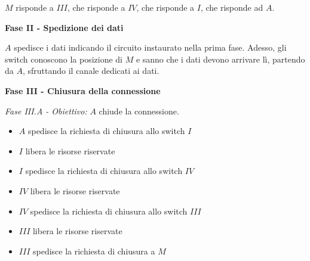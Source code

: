             $M$ risponde a $III$, che risponde a $IV$, che risponde a $I$, che risponde ad $A$.
            
            \vspace{3mm}
            
            \textbf{Fase II - Spedizione dei dati}
            
            \vspace{3mm}
            
            $A$ spedisce i dati indicando il circuito instaurato nella prima fase. Adesso, gli switch conoscono la posizione di $M$ e sanno che i dati devono arrivare lì, partendo da $A$, sfruttando il canale dedicati ai dati.
            
            \vspace{3mm}
            
            \textbf{Fase III - Chiusura della connessione}
            
            \vspace{3mm}
            
            \textit{ Fase III.A - Obiettivo:} $A$ chiude la connessione.
            
            \begin{itemize}
                \item 
                    $A$ spedisce la richiesta di chiusura allo switch $I$
                
                \item
                    $I$ libera le risorse riservate
                    
                \item
                    $I$ spedisce la richiesta di chiusura allo switch $IV$
                    
                \item
                    $IV$ libera le risorse riservate
                    
                \item
                    $IV$ spedisce la richiesta di chiusura allo switch $III$
                    
                \item
                    $III$ libera le risorse riservate
                    
                \item
                    $III$ spedisce la richiesta di chiusura a $M$
            \end{itemize}
            

